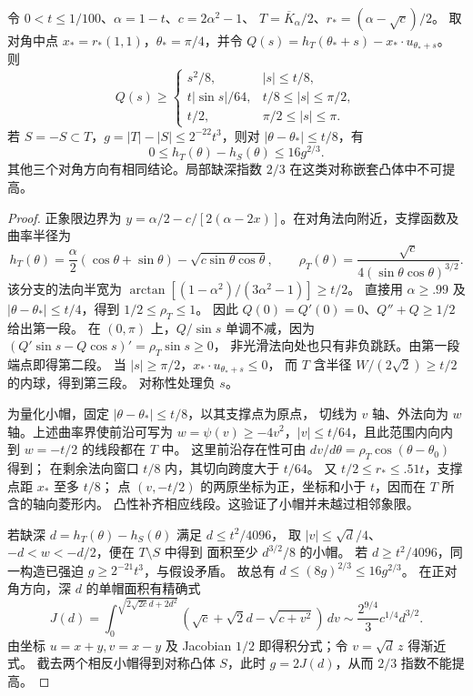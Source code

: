 \begin{lemma}[对角小帽及三段支撑间隙]\label{pb:local-caps}
令 $0<t\le1/100$、$\alpha=1-t$、$c=2\alpha^2-1$、
$T=\overline K_\alpha/2$、$r_*=(\alpha-\sqrt c)/2$。
取对角中点 $x_*=r_*(1,1)$，$\theta_*=\pi/4$，并令
$Q(s)=h_T(\theta_*+s)-x_*\cdot u_{\theta_*+s}$。
则
\[
 Q(s)\ge
 \begin{cases}
 s^2/8,&|s|\le t/8,\\
 t|\sin s|/64,&t/8\le|s|\le\pi/2,\\
 t/2,&\pi/2\le|s|\le\pi.
 \end{cases}
\]
若 $S=-S\subset T$，$g=|T|-|S|\le2^{-22}t^3$，则对
$|\theta-\theta_*|\le t/8$，有
\[
 0\le h_T(\theta)-h_S(\theta)\le16g^{2/3}.
\]
其他三个对角方向有相同结论。局部缺深指数 $2/3$ 在这类对称嵌套凸体中不可提高。
\end{lemma}
\begin{proof}
正象限边界为
$y=\alpha/2-c/[2(\alpha-2x)]$。在对角法向附近，支撑函数及曲率半径为
\[
 h_T(\theta)=\frac\alpha2(\cos\theta+\sin\theta)
 -\sqrt{c\sin\theta\cos\theta},\qquad
 \rho_T(\theta)=\frac{\sqrt c}{4(\sin\theta\cos\theta)^{3/2}}.
\]
该分支的法向半宽为
$\arctan[(1-\alpha^2)/(3\alpha^2-1)]\ge t/2$。
直接用 $\alpha\ge.99$ 及 $|\theta-\theta_*|\le t/4$，得到
$1/2\le\rho_T\le1$。
因此 $Q(0)=Q'(0)=0$、$Q''+Q\ge1/2$ 给出第一段。
在 $(0,\pi)$ 上，$Q/\sin s$ 单调不减，因为
$(Q'\sin s-Q\cos s)'=\rho_T\sin s\ge0$，
非光滑法向处也只有非负跳跃。由第一段端点即得第二段。
当 $|s|\ge\pi/2$，$x_*\cdot u_{\theta_*+s}\le0$，
而 $T$ 含半径 $W/(2\sqrt2)\ge t/2$ 的内球，得到第三段。
对称性处理负 $s$。

为量化小帽，固定 $|\theta-\theta_*|\le t/8$，以其支撑点为原点，
切线为 $v$ 轴、外法向为 $w$ 轴。上述曲率界使前沿可写为
$w=\psi(v)\ge-4v^2$，$|v|\le t/64$，且此范围内向内到 $w=-t/2$ 的线段都在 $T$ 中。
这里前沿存在性可由 $dv/d\theta=\rho_T\cos(\theta-\theta_0)$ 得到；
在剩余法向窗口 $t/8$ 内，其切向跨度大于 $t/64$。
又 $t/2\le r_*\le.51t$，支撑点距 $x_*$ 至多 $t/8$；
点 $(v,-t/2)$ 的两原坐标为正，坐标和小于 $t$，因而在 $T$ 所含的轴向菱形内。
凸性补齐相应线段。这验证了小帽并未越过相邻象限。

若缺深 $d=h_T(\theta)-h_S(\theta)$ 满足 $d\le t^2/4096$，
取 $|v|\le\sqrt d/4$、$-d<w<-d/2$，便在 $T\setminus S$ 中得到
面积至少 $d^{3/2}/8$ 的小帽。
若 $d\ge t^2/4096$，同一构造已强迫 $g\ge2^{-21}t^3$，与假设矛盾。
故总有 $d\le(8g)^{2/3}\le16g^{2/3}$。
在正对角方向，深 $d$ 的单帽面积有精确式
\[
 J(d)=\int_0^{\sqrt{2\sqrt{2c}d+2d^2}}
 (\sqrt c+\sqrt2d-\sqrt{c+v^2})\,dv
 \sim\frac{2^{9/4}}3c^{1/4}d^{3/2}.
\]
由坐标 $u=x+y,v=x-y$ 及 Jacobian $1/2$ 即得积分式；令 $v=\sqrt d\,z$ 得渐近式。
截去两个相反小帽得到对称凸体 $S$，此时 $g=2J(d)$，从而 $2/3$ 指数不能提高。
\end{proof}

